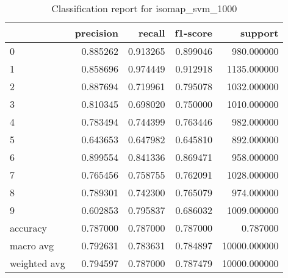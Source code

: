 \begin{table}[htb!]
\centering
\caption{Classification report for isomap_svm_1000}
\label{tab:classification-report-isomap_svm_1000}
\begin{tabular}{lrrrr}
\toprule
 & precision & recall & f1-score & support \\
\midrule
0 & 0.885262 & 0.913265 & 0.899046 & 980.000000 \\
1 & 0.858696 & 0.974449 & 0.912918 & 1135.000000 \\
2 & 0.887694 & 0.719961 & 0.795078 & 1032.000000 \\
3 & 0.810345 & 0.698020 & 0.750000 & 1010.000000 \\
4 & 0.783494 & 0.744399 & 0.763446 & 982.000000 \\
5 & 0.643653 & 0.647982 & 0.645810 & 892.000000 \\
6 & 0.899554 & 0.841336 & 0.869471 & 958.000000 \\
7 & 0.765456 & 0.758755 & 0.762091 & 1028.000000 \\
8 & 0.789301 & 0.742300 & 0.765079 & 974.000000 \\
9 & 0.602853 & 0.795837 & 0.686032 & 1009.000000 \\
accuracy & 0.787000 & 0.787000 & 0.787000 & 0.787000 \\
macro avg & 0.792631 & 0.783631 & 0.784897 & 10000.000000 \\
weighted avg & 0.794597 & 0.787000 & 0.787479 & 10000.000000 \\
\bottomrule
\end{tabular}
\end{table}
